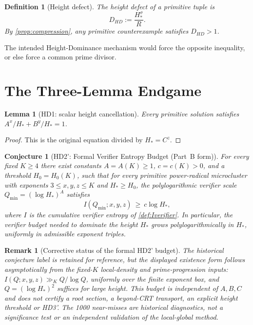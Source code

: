 \documentclass[11pt,a4paper]{article}
\newtheorem{lemma}[theorem]{Lemma}
\newtheorem{conjecture}[theorem]{Conjecture}
\newtheorem{definition}[theorem]{Definition}
\newtheorem{remark}[theorem]{Remark}
\begin{document}
\begin{definition}[Height defect]
The height defect of a primitive tuple is
\[
  D_{HD} := \frac{H_*^{\sigma}}{R}.
\]
By \cref{prop:compression}, any primitive counterexample satisfies
$D_{HD}>1$.
\end{definition}

The intended Height-Dominance mechanism would force the opposite
inequality, or else force a common prime divisor.

\section{The Three-Lemma Endgame}

\begin{lemma}[HD1: scalar height cancellation]
\label{lem:hd1}
Every primitive solution satisfies
$A^x/H_* + B^y/H_* = 1$.
\end{lemma}

\begin{proof}
This is the original equation divided by $H_*=C^z$.
\end{proof}

\begin{conjecture}[HD2': Formal Verifier Entropy Budget (Part~B form)]
\label{conj:hd2prime}
For every fixed $K \ge 4$ there exist constants $A=A(K) \ge 1$,
$c=c(K) > 0$, and a threshold $H_{0}=H_{0}(K)$, such that for every
primitive power-radical microcluster with exponents $3 \le x,y,z \le K$
and $H_* \ge H_{0}$, the polylogarithmic verifier scale
$Q_{\min} = (\log H_*)^{A}$ satisfies
\[
  I(Q_{\min};x,y,z) \ \ge\ c \log H_*,
\]
where $I$ is the cumulative verifier entropy of \cref{def:Iverifier}.
In particular, the verifier budget needed to dominate the height
$H_*$ grows polylogarithmically in $H_*$, uniformly in admissible
exponent triples.
\end{conjecture}

\begin{remark}[Corrective status of the formal HD2' budget]
The historical conjecture label is retained for reference, but the displayed
existence form follows asymptotically from the fixed-$K$ local-density and
prime-progression inputs: $I(Q;x,y,z)\gg_K Q/\log Q$, uniformly over the
finite exponent box, and $Q=(\log H_*)^2$ suffices for large height.
This budget is independent of $A,B,C$ and does not certify a root section,
a beyond-CRT transport, an explicit height threshold or HD3'.
The 1000 near-misses are historical diagnostics, not a significance test
or an independent validation of the local-global method.
\end{remark}
\end{document}
